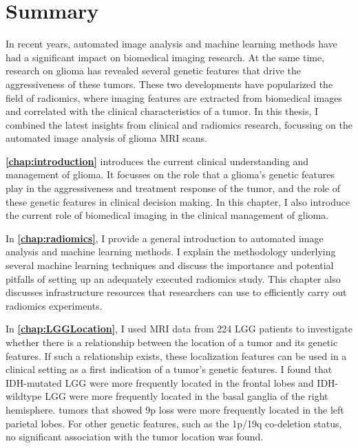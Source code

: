 \chapter{Summary}
\begin{ChapterAbstractNoTitle}
\end{ChapterAbstractNoTitle}

In recent years, automated image analysis and machine learning methods have had a significant impact on biomedical imaging research.
At the same time, research on glioma has revealed several genetic features that drive the aggressiveness of these \glspl{tumor}.
These two developments have popularized the field of radiomics, where imaging features are extracted from biomedical images and correlated with the clinical characteristics of a \gls{tumor}.
In this thesis, I combined the latest insights from clinical and radiomics research, focussing on the automated image analysis of glioma \gls{MRI} scans.

\textbf{\cref{chap:introduction}} introduces the current clinical understanding and management of glioma.
It focusses on the role that a glioma's genetic features play in the aggressiveness and treatment response of the \gls{tumor}, and the role of these genetic features in clinical decision making.
In this chapter, I also introduce the current role of biomedical imaging in the clinical management of glioma.

In \textbf{\cref{chap:radiomics}}, I provide a general introduction to automated image analysis and machine learning methods.
I explain the methodology underlying several machine learning techniques and discuss the importance and potential pitfalls of setting up an adequately executed radiomics study.
This chapter also discusses infrastructure resources that researchers can use to efficiently carry out radiomics experiments.

In \textbf{\cref{chap:LGGLocation}}, I used MRI data from 224 \gls{LGG} patients to investigate whether there is a relationship between the location of a \gls{tumor} and its genetic features.
If such a relationship exists, these localization features can be used in a clinical setting as a first indication of a \gls{tumor}'s genetic features.
I found that \gls{IDH}-mutated \gls{LGG} were more frequently located in the frontal lobes and \gls{IDH}-wildtype \gls{LGG} were more frequently located in the basal ganglia of the right hemisphere.
\Glspl{tumor} that showed 9p loss were more frequently located in the left parietal lobes.
For other genetic features, such as the 1p/19q co-deletion status, no significant association with the \gls{tumor} location was found.

